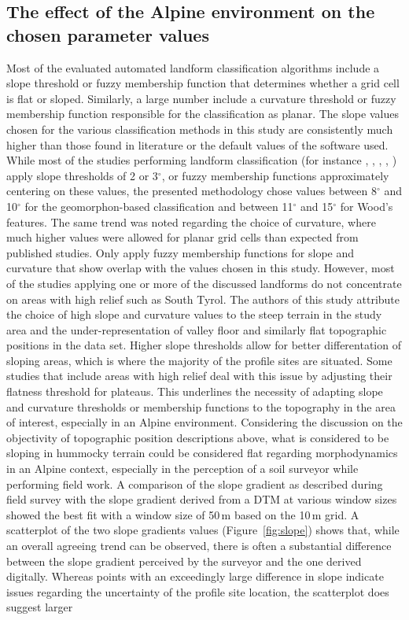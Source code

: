 \documentclass[preprint,12pt,authoryear]{elsarticle}
\begin{document}
\subsection{The effect of the Alpine environment on the chosen parameter values} \label{influence_of_environment}
Most of the evaluated automated landform classification algorithms include a slope threshold or fuzzy membership function that determines whether a grid cell is flat or sloped. Similarly, a large number include a curvature threshold or fuzzy membership function responsible for the classification as planar. The slope values chosen for the various classification methods in this study are consistently much higher than those found in literature or the default values of the software used. While most of the studies performing landform classification (for instance \cite{Barka2011}, \cite{Bocco2001}, \cite{Ehsani2008}, \cite{Jasiewicz2013}, \cite{MacMillan2000a}) apply slope thresholds of 2 or 3$^{\circ}$, or fuzzy membership functions approximately centering on these values, the presented methodology chose values between 8$^{\circ}$ and 10$^{\circ}$ for the geomorphon-based classification and between 11$^{\circ}$ and 15$^{\circ}$ for Wood's features. The same trend was noted regarding the choice of curvature, where much higher values were allowed for planar grid cells than expected from published studies. Only \cite{Schmidt2004} apply fuzzy membership functions for slope and curvature that show overlap with the values chosen in this study. However, most of the studies applying one or more of the discussed landforms do not concentrate on areas with high relief such as South Tyrol. The authors of this study attribute the choice of high slope and curvature values to the steep terrain in the study area and the under-representation of valley floor and similarly flat topographic positions in the data set. Higher slope  thresholds allow for better differentation of sloping areas, which is where the majority of the profile sites are situated. Some studies that include areas with high relief \citep{Bocco2001,Herbst2012} deal with this issue by adjusting their flatness threshold for plateaus. This underlines the necessity of adapting slope and curvature thresholds or membership functions to the topography in the area of interest, especially in an Alpine environment. Considering the discussion on the objectivity of topographic position descriptions above, what is considered to be sloping in hummocky terrain could be considered flat regarding morphodynamics in an Alpine context, especially in the perception of a soil surveyor while performing field work. A comparison of the slope gradient as described during field survey with the slope gradient derived from a DTM at various window sizes showed the best fit with a window size of 50\,m based on the 10\,m grid. A scatterplot of the two slope gradients values (Figure~\ref{fig:slope}) shows that, while an overall agreeing trend can be observed, there is often a substantial difference between the slope gradient perceived by the surveyor and the one derived digitally. Whereas points with an exceedingly large difference in slope indicate issues regarding the uncertainty of the profile site location, the scatterplot does suggest larger 
\end{document}
